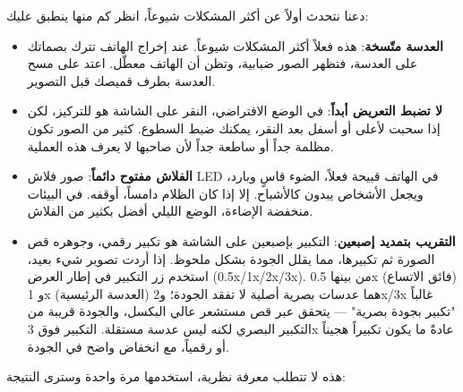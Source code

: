 


دعنا نتحدث أولاً عن أكثر المشكلات شيوعاً، انظر كم منها ينطبق عليك:

\begin{itemize}
  \item \textbf{العدسة متّسخة}: هذه فعلاً أكثر المشكلات شيوعاً. عند إخراج الهاتف تترك بصماتك على العدسة، فتظهر الصور ضبابية، وتظن أن الهاتف معطّل. اعتد على مسح العدسة بطرف قميصك قبل التصوير.
  \item \textbf{لا تضبط التعريض أبداً}: في الوضع الافتراضي، النقر على الشاشة هو للتركيز، لكن إذا سحبت لأعلى أو أسفل بعد النقر، يمكنك ضبط السطوع. كثير من الصور تكون مظلمة جداً أو ساطعة جداً لأن صاحبها لا يعرف هذه العملية.
  \item \textbf{الفلاش مفتوح دائماً}: صور فلاش LED في الهاتف قبيحة فعلاً، الضوء قاسٍ وبارد، ويجعل الأشخاص يبدون كالأشباح. إلا إذا كان الظلام دامساً، أوقفه. في البيئات منخفضة الإضاءة، الوضع الليلي أفضل بكثير من الفلاش.
  \item \textbf{التقريب بتمديد إصبعين}: التكبير بإصبعين على الشاشة هو تكبير رقمي، وجوهره قص الصورة ثم تكبيرها، مما يقلل الجودة بشكل ملحوظ. إذا أردت تصوير شيء بعيد، استخدم زر التكبير في إطار العرض (0.5x/1x/2x/3x). من بينها 0.5x (فائق الاتساع) و 1x (العدسة الرئيسية) هما عدسات بصرية أصلية لا تفقد الجودة؛ و2x/3x غالباً "تكبير بجودة بصرية" — يتحقق عبر قص مستشعر عالي البكسل، والجودة قريبة من التكبير البصري لكنه ليس عدسة مستقلة. التكبير فوق 3x عادةً ما يكون تكبيراً هجيناً أو رقمياً، مع انخفاض واضح في الجودة.
\end{itemize}


هذه لا تتطلب معرفة نظرية، استخدمها مرة واحدة وسترى النتيجة:

